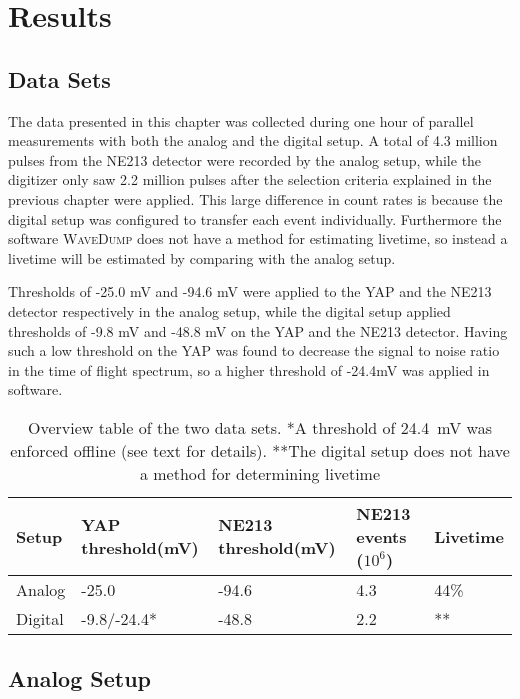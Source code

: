 \documentclass[main.tex]{subfiles}
\begin{document}
\chapter{Results}\label{ch:results}

\section{Data Sets}
The data presented in this chapter was collected during one hour of parallel measurements with both the analog and the digital setup. A total of 4.3 million pulses from the NE213 detector were recorded by the analog setup, while the digitizer only saw 2.2 million pulses after the selection criteria explained in the previous chapter were applied. This large difference in count rates is because the digital setup was configured to transfer each event individually. Furthermore the software \textsc{WaveDump} does not have a method for estimating livetime, so instead a livetime will be estimated by comparing with the analog setup.

Thresholds of -25.0 mV and -94.6 mV were applied to the YAP and the NE213 detector respectively in the analog setup, while the digital setup applied thresholds of -9.8 mV and -48.8 mV on the YAP and the NE213 detector. Having such a low threshold on the YAP was found to decrease the signal to noise ratio in the time of flight spectrum, so a higher threshold of -24.4\si{\milli\volt} was applied in software.
\begin{table}[bh]
\begin{tabular}{|l|l|l|l|l|}
\hline
Setup   & YAP threshold(mV) & NE213 threshold(mV) & NE213 events ($\text{10}^\text{6}$) & Livetime \\ \hline
Analog  & -25.0              & -94.6                & 4.3      & 44\%             \\ \hline
Digital & -9.8/-24.4*			& -48.8                & 2.2      & **             \\ \hline
\end{tabular}
\caption[Overview table of the two data sets.]{Overview table of the two data sets. *A threshold of \SI{24.4}{mV} was enforced offline (see text for details). **The digital setup does not have a method for determining livetime}
\label{tab:settings}
\end{table}

\section{Analog Setup}
\end{document}
